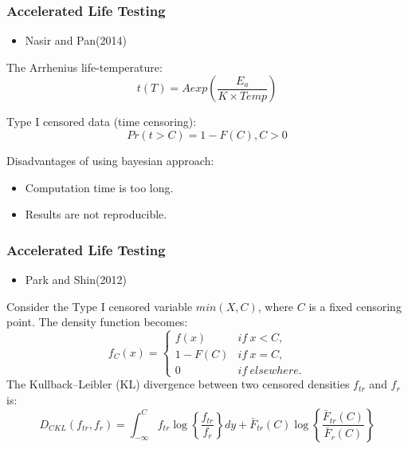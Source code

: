 \documentclass[xcolor=dvipsnames,aspectratio=1610]{beamer}
\begin{document}
\begin{frame}
\frametitle{Accelerated Life Testing}
\begin{itemize}
\item Nasir and Pan(2014)
\end{itemize}

The Arrhenius life-temperature:
$$t(T)=Aexp\left( \frac{E_a}{K \times Temp} \right)$$

Type I censored data (time censoring):
$$Pr(t>C)=1-F(C),C>0$$

Disadvantages of using bayesian approach:
\begin{itemize}
\item Computation time is too long.

\item Results are not reproducible.
\end{itemize}

% 



\end{frame}

\begin{frame}
\frametitle{Accelerated Life Testing}
\begin{itemize}
\item Park and Shin(2012)
\end{itemize}
Consider the Type I censored variable $min(X,C)$, where $C$ is a fixed censoring point. The density function becomes:
$$f_C(x)=\begin{cases}f(x) & if\ x < C,\\1-F(C) & if\  x = C,\\0 & if\ elsewhere.\end{cases}$$
The Kullback–Leibler (KL) divergence between two censored densities $f_{tr}$ and $f_r$ is:
$$D_{CKL}(f_{tr}, f_r) = \int_{-\infty}^C f_{tr} \log \left\{ \frac{f_{tr}}{f_r} \right\} dy + \bar{F}_{tr}(C) \log \left\{ \frac{\bar{F}_{tr}(C)}{\bar{F}_r(C)} \right\}$$
\end{frame}
\end{document}
